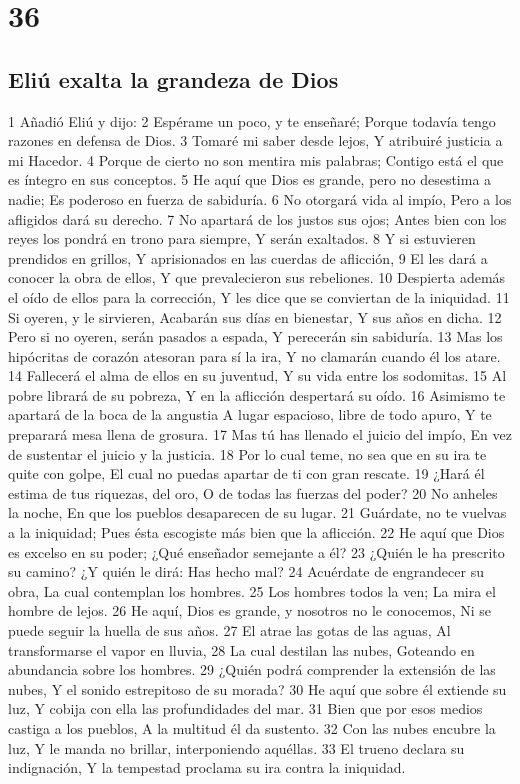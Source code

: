 \chapter{36}

\section*{Eliú exalta la grandeza de Dios}  

1 Añadió Eliú y dijo:  
2 Espérame un poco, y te enseñaré;  
Porque todavía tengo razones en defensa de Dios. 
3 Tomaré mi saber desde lejos,  
Y atribuiré justicia a mi Hacedor.  
4 Porque de cierto no son mentira mis palabras;  
Contigo está el que es íntegro en sus conceptos.  
5 He aquí que Dios es grande, pero no desestima a nadie;  
Es poderoso en fuerza de sabiduría.  
6 No otorgará vida al impío,  
Pero a los afligidos dará su derecho.  
7 No apartará de los justos sus ojos;  
Antes bien con los reyes los pondrá en trono para siempre,  
Y serán exaltados.  
8 Y si estuvieren prendidos en grillos,  
Y aprisionados en las cuerdas de aflicción,  
9 El les dará a conocer la obra de ellos,  
Y que prevalecieron sus rebeliones. 
10 Despierta además el oído de ellos para la corrección,  
Y les dice que se conviertan de la iniquidad.  
11 Si oyeren, y le sirvieren,  
Acabarán sus días en bienestar,  
Y sus años en dicha.  
12 Pero si no oyeren, serán pasados a espada,  
Y perecerán sin sabiduría.  
13 Mas los hipócritas de corazón atesoran para sí la ira,  
Y no clamarán cuando él los atare.  
14 Fallecerá el alma de ellos en su juventud,  
Y su vida entre los sodomitas.  
15 Al pobre librará de su pobreza,  
Y en la aflicción despertará su oído.  
16 Asimismo te apartará de la boca de la angustia  
A lugar espacioso, libre de todo apuro,  
Y te preparará mesa llena de grosura.  
17 Mas tú has llenado el juicio del impío,  
En vez de sustentar el juicio y la justicia.  
18 Por lo cual teme, no sea que en su ira te quite con golpe,  
El cual no puedas apartar de ti con gran rescate. 
19 ¿Hará él estima de tus riquezas, del oro,  
O de todas las fuerzas del poder?  
20 No anheles la noche,  
En que los pueblos desaparecen de su lugar.  
21 Guárdate, no te vuelvas a la iniquidad;  
Pues ésta escogiste más bien que la aflicción.  
22 He aquí que Dios es excelso en su poder;  
¿Qué enseñador semejante a él?  
23 ¿Quién le ha prescrito su camino?  
¿Y quién le dirá: Has hecho mal?  
24 Acuérdate de engrandecer su obra,  
La cual contemplan los hombres.  
25 Los hombres todos la ven;  
La mira el hombre de lejos.  
26 He aquí, Dios es grande, y nosotros no le conocemos,  
Ni se puede seguir la huella de sus años.  
27 El atrae las gotas de las aguas,  
Al transformarse el vapor en lluvia,  
28 La cual destilan las nubes,  
Goteando en abundancia sobre los hombres.  
29 ¿Quién podrá comprender la extensión de las nubes,  
Y el sonido estrepitoso de su morada?  
30 He aquí que sobre él extiende su luz,  
Y cobija con ella las profundidades del mar.  
31 Bien que por esos medios castiga a los pueblos,  
A la multitud él da sustento.  
32 Con las nubes encubre la luz,  
Y le manda no brillar, interponiendo aquéllas.  
33 El trueno declara su indignación,  
Y la tempestad proclama su ira contra la iniquidad.  

